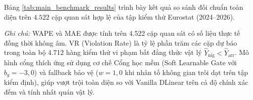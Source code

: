 Bảng \ref{tab:main_benchmark_results} trình bày kết quả so sánh đối chuẩn toàn diện trên $4.522$ cặp quan sát hợp lệ của tập kiểm thử Eurostat (2024--2026).

\begin{table}[H]
\centering
\caption{Kết quả đối sánh hiệu năng dự báo tổng thể trên tập dữ liệu Eurostat (2024--2026)}
\label{tab:main_benchmark_results}
\par\vspace{3pt}
\begin{minipage}{\textwidth}
\footnotesize\textit{Ghi chú:} WAPE và MAE được tính trên 4.522 cặp quan sát có số liệu thực tế đồng thời không âm. VR (Violation Rate) là tỷ lệ phần trăm các cặp dự báo trong toàn bộ 4.712 hàng kiểm thử vi phạm bất đẳng thức vật lý $\hat{Y}_{\text{nig}} < \hat{Y}_{\text{arr}}$. Mô hình cổng thích ứng sử dụng cơ chế Cổng học mềm (Soft Learnable Gate với $b_g = -3{,}0$) và fallback bảo vệ ($w = 1{,}0$ khi nhân tố không gian trôi dạt trên tập kiểm định), giúp vượt trội toàn diện so với Vanilla DLinear trên cả độ chính xác đếm và tính nhất quán vật lý.
\end{minipage}
\end{table}

